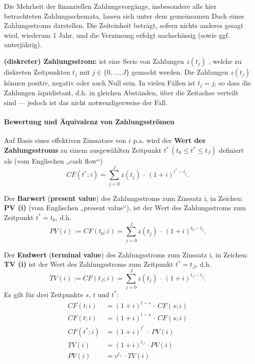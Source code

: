 \documentclass[
]{article}
\begin{document}
Die Mehrheit der finanziellen Zahlungsvorgänge, insbesondere alle hier
betrachteten Zahlungsschemata, lassen sich unter dem gemeinsamen Dach
eines Zahlungsstroms darstellen. Die Zeiteinheit beträgt, sofern nichts
anderes gesagt wird, wiederum 1 Jahr, und die Verzinsung erfolgt
nachschüssig (sowie ggf. unterjährig).

\textbf{(diskreter) Zahlungsstrom:} ist eine Serie von Zahlungen
\(z(t_j)\) , welche zu diskreten Zeitpunkten \(t_j\) mit
\(j \in \{0,\dots, J\}\) gemacht werden. Die Zahlungen \(z(t_j)\) können
positiv, negativ oder auch Null sein. In vielen Fällen ist \(t_j = j\),
so dass die Zahlungen äquidistant, d.h. in gleichen Abständen, über die
Zeitachse verteilt sind --- jedoch ist das nicht notwendigerweise der
Fall.

\hypertarget{bewertung-und-uxe4quivalenz-von-zahlungsstruxf6men}{%
\paragraph{Bewertung und Äquivalenz von
Zahlungsströmen}\label{bewertung-und-uxe4quivalenz-von-zahlungsstruxf6men}}

Auf Basis eines effektiven Zinssatzes von \(i\) p.a. wird der
\textbf{Wert des Zahlungsstroms} zu einem ausgewählten Zeitpunkt
\(t^{\ast}\, (t_0 \leq t^{\ast} \leq t_J)\) definiert als (vom
Englischen „cash flow``) \[
  CF(t^{\ast};i) = \sum_{j=0}^J z(t_j)\,\cdot\, (1+i)^{t^{\ast}-t_j}.
\]

Der \textbf{Barwert} (\textbf{present value}) des Zahlungsstroms zum
Zinssatz i, in Zeichen: \textbf{PV (i)} (vom Englischen „present
value``), ist der Wert des Zahlungsstroms zum Zeitpunkt
\(t^{\ast} = t_0\), d.h. \[
  PV(i) := CF(t_0;i) =  \sum_{j=0}^J z(t_j)\,\cdot\, (1+i)^{t_0-t_j}.
\]

Der \textbf{Endwert} (\textbf{terminal value}) des Zahlungsstroms zum
Zinssatz i, in Zeichen: \textbf{TV (i)} ist der Wert des Zahlungsstroms
zum Zeitpunkt \(t^{\ast} = t_J\), d.h. \[
  TV(i) := CF(t_J;i) =  \sum_{j=0}^J z(t_j)\,\cdot\, (1+i)^{t_J-t_j}.
\] Es gilt für drei Zeitpunkte \(s\), \(t\) und \(t^{\ast}\):
\begin{align*}
  CF(t;i) &= (1+i)^{t-s}\,\cdot\, CF(s;i)\\
  CF(t;i) &= (1+i)^{t-s}\,\cdot\, CF(s;i)\\
  CF(t^{\ast};i) &= (1+i)^{t^{\ast}}\,\cdot\,PV(i)\\
  TV(i) &= (1+i)^{t_J}\,\cdot PV(i)\\
  PV(i) &= v^{t_J}\,\cdot TV(i)
\end{align*}
\end{document}
